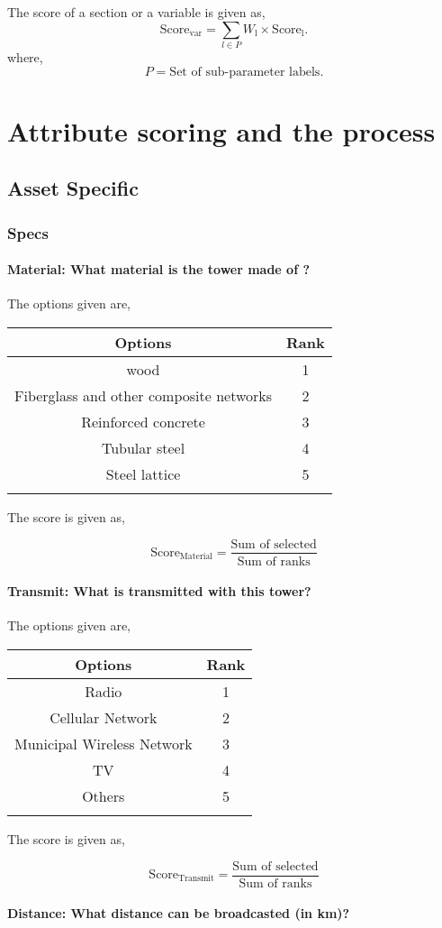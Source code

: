 \documentclass[oneside,twocolumn]{article}
\newcommand{\tsub}[2]{\text{#1}_{\text{#2}}}
\newcommand{\tsubb}[2]{#1_{\text{#2}}}
\newcommand{\dsub}[2]{\dfrac{\text{#1}}{\text{#2}}}
\newcommand{\multsel}[1]
{
	\[
		\tsub{Score}{#1} = \dsub{Sum of selected}{Sum of ranks}
	\]
}
\newenvironment{ttable}
{
\begin{center}
\begin{tabular}{c|c}
\hline
}
{
\\ \hline
\end{tabular}
\end{center}
}
\begin{document}
The score of a section or a variable is given as,
\[
	\tsub{Score}{var} = \sum_{l \in P} \tsubb{W}{l} \times \tsub{Score}{l}.
\]
where,
\[
	P = \text{Set of sub-parameter labels.}
\]
\section{Attribute scoring and the
process}
\subsection{Asset Specific}
\subsubsection{Specs}

\paragraph{Material: What material is the tower made of ?}

The options given are,
\begin{ttable}
Options & Rank \\ \hline
wood & 1 \\
Fiberglass and other composite networks & 2 \\
Reinforced concrete & 3 \\
Tubular steel & 4 \\
Steel lattice & 5 \\
\hline
\end{ttable}
The score is given as,
\multsel{Material}
\paragraph{Transmit: What is transmitted with this tower?}

The options given are,
\begin{ttable}
Options & Rank \\ \hline
Radio & 1 \\
Cellular Network & 2 \\
Municipal Wireless Network & 3 \\
TV & 4 \\
Others & 5 \\
\hline
\end{ttable}
The score is given as,
\multsel{Transmit}
\paragraph{Distance: What distance can be broadcasted (in km)?}
\end{document}
